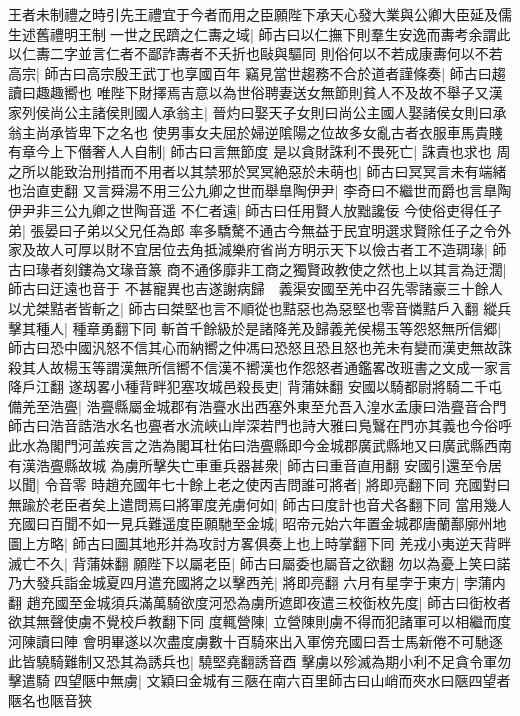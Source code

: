 王者未制禮之時引先王禮宜于今者而用之臣願陛下承天心發大業與公卿大臣延及儒生述舊禮明王制一世之民躋之仁夀之域|{
	師古曰以仁撫下則羣生安逸而夀考余謂此以仁夀二字並言仁者不鄙詐夀者不夭折也敺與驅同}
則俗何以不若成康夀何以不若高宗|{
	師古曰高宗殷王武丁也享國百年}
竊見當世趨務不合於道者謹條奏|{
	師古曰趨讀曰趣趣嚮也}
唯陛下財擇焉吉意以為世俗聘妻送女無節則貧人不及故不舉子又漢家列侯尚公主諸侯則國人承翁主|{
	晉灼曰娶天子女則曰尚公主國人娶諸侯女則曰承翁主尚承皆卑下之名也}
使男事女夫屈於婦逆隂陽之位故多女亂古者衣服車馬貴賤有章今上下僭奢人人自制|{
	師古曰言無節度}
是以貪財誅利不畏死亡|{
	誅責也求也}
周之所以能致治刑措而不用者以其禁邪於冥冥絶惡於未萌也|{
	師古曰冥冥言未有端緒也治直吏翻}
又言舜湯不用三公九卿之世而舉臯陶伊尹|{
	李奇曰不繼世而爵也言臯陶伊尹非三公九卿之世陶音遥}
不仁者遠|{
	師古曰任用賢人放黜讒佞}
今使俗吏得任子弟|{
	張晏曰子弟以父兄任為郎}
率多驕驁不通古今無益于民宜明選求賢除任子之令外家及故人可厚以財不宜居位去角抵減樂府省尚方明示天下以儉古者工不造琱瑑|{
	師古曰瑑者刻鏤為文瑑音篆}
商不通侈靡非工商之獨賢政教使之然也上以其言為迂濶|{
	師古曰迂遠也音于}
不甚寵異也吉遂謝病歸　義渠安國至羌中召先零諸豪三十餘人以尤桀黠者皆斬之|{
	師古曰桀堅也言不順從也黠惡也為惡堅也零音憐黠戶入翻}
縱兵擊其種人|{
	種章勇翻下同}
斬首千餘級於是諸降羌及歸義羌侯楊玉等怨怒無所信郷|{
	師古曰恐中國汎怒不信其心而納嚮之仲馮曰恐怒且恐且怒也羌未有變而漢吏無故誅殺其人故楊玉等謂漢無所信嚮不信漢不嚮漢也作怨怒者通鑑畧改班書之文成一家言降戶江翻}
遂刼畧小種背畔犯塞攻城邑殺長吏|{
	背蒲妹翻}
安國以騎都尉將騎二千屯備羌至浩亹|{
	浩亹縣屬金城郡有浩亹水出西塞外東至允吾入湟水孟康曰浩亹音合門師古曰浩音誥浩水名也亹者水流峽山岸深若門也詩大雅曰鳬鷖在門亦其義也今俗呼此水為閣門河盖疾言之浩為閣耳杜佑曰浩亹縣即今金城郡廣武縣地又曰廣武縣西南有漢浩亹縣故城}
為虜所擊失亡車重兵器甚衆|{
	師古曰重音直用翻}
安國引還至令居以聞|{
	令音零}
時趙充國年七十餘上老之使丙吉問誰可將者|{
	將即亮翻下同}
充國對曰無踰於老臣者矣上遣問焉曰將軍度羌虜何如|{
	師古曰度計也音犬各翻下同}
當用幾人充國曰百聞不如一見兵難遥度臣願馳至金城|{
	昭帝元始六年置金城郡唐蘭鄯廓州地}
圖上方略|{
	師古曰圖其地形并為攻討方畧俱奏上也上時掌翻下同}
羌戎小夷逆天背畔滅亡不久|{
	背蒲妹翻}
願陛下以屬老臣|{
	師古曰屬委也屬音之欲翻}
勿以為憂上笑曰諾乃大發兵詣金城夏四月遣充國將之以擊西羌|{
	將即亮翻}
六月有星孛于東方|{
	孛蒲内翻}
趙充國至金城須兵滿萬騎欲度河恐為虜所遮即夜遣三校衘枚先度|{
	師古曰衘枚者欲其無聲使虜不覺校戶教翻下同}
度輒營陳|{
	立營陳則虜不得而犯諸軍可以相繼而度河陳讀曰陣}
會明畢遂以次盡度虜數十百騎來出入軍傍充國曰吾士馬新倦不可馳逐此皆驍騎難制又恐其為誘兵也|{
	驍堅堯翻誘音酉}
擊虜以殄滅為期小利不足貪令軍勿擊遣騎四望陿中無虜|{
	文穎曰金城有三陿在南六百里師古曰山峭而夾水曰陿四望者陿名也陿音狹}
